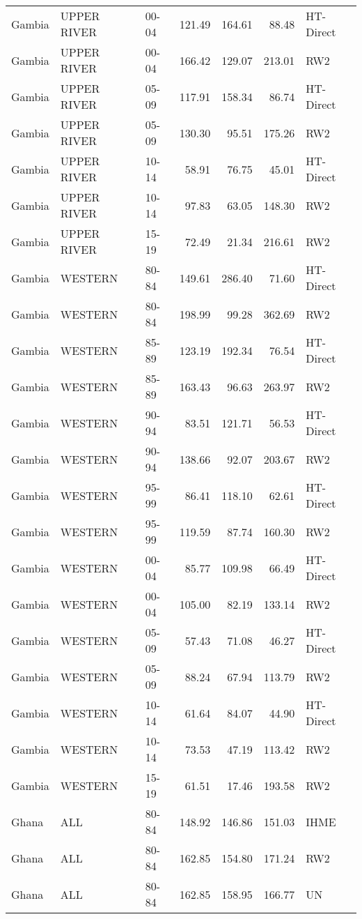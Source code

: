\begin{longtable}{lllrrrl}
  Gambia & UPPER RIVER & 00-04 & 121.49 & 164.61 & 88.48 & HT-Direct \\ 
  Gambia & UPPER RIVER & 00-04 & 166.42 & 129.07 & 213.01 & RW2 \\ 
  Gambia & UPPER RIVER & 05-09 & 117.91 & 158.34 & 86.74 & HT-Direct \\ 
  Gambia & UPPER RIVER & 05-09 & 130.30 & 95.51 & 175.26 & RW2 \\ 
  Gambia & UPPER RIVER & 10-14 & 58.91 & 76.75 & 45.01 & HT-Direct \\ 
  Gambia & UPPER RIVER & 10-14 & 97.83 & 63.05 & 148.30 & RW2 \\ 
  Gambia & UPPER RIVER & 15-19 & 72.49 & 21.34 & 216.61 & RW2 \\ 
  Gambia & WESTERN & 80-84 & 149.61 & 286.40 & 71.60 & HT-Direct \\ 
  Gambia & WESTERN & 80-84 & 198.99 & 99.28 & 362.69 & RW2 \\ 
  Gambia & WESTERN & 85-89 & 123.19 & 192.34 & 76.54 & HT-Direct \\ 
  Gambia & WESTERN & 85-89 & 163.43 & 96.63 & 263.97 & RW2 \\ 
  Gambia & WESTERN & 90-94 & 83.51 & 121.71 & 56.53 & HT-Direct \\ 
  Gambia & WESTERN & 90-94 & 138.66 & 92.07 & 203.67 & RW2 \\ 
  Gambia & WESTERN & 95-99 & 86.41 & 118.10 & 62.61 & HT-Direct \\ 
  Gambia & WESTERN & 95-99 & 119.59 & 87.74 & 160.30 & RW2 \\ 
  Gambia & WESTERN & 00-04 & 85.77 & 109.98 & 66.49 & HT-Direct \\ 
  Gambia & WESTERN & 00-04 & 105.00 & 82.19 & 133.14 & RW2 \\ 
  Gambia & WESTERN & 05-09 & 57.43 & 71.08 & 46.27 & HT-Direct \\ 
  Gambia & WESTERN & 05-09 & 88.24 & 67.94 & 113.79 & RW2 \\ 
  Gambia & WESTERN & 10-14 & 61.64 & 84.07 & 44.90 & HT-Direct \\ 
  Gambia & WESTERN & 10-14 & 73.53 & 47.19 & 113.42 & RW2 \\ 
  Gambia & WESTERN & 15-19 & 61.51 & 17.46 & 193.58 & RW2 \\ 
  Ghana & ALL & 80-84 & 148.92 & 146.86 & 151.03 & IHME \\ 
  Ghana & ALL & 80-84 & 162.85 & 154.80 & 171.24 & RW2 \\ 
  Ghana & ALL & 80-84 & 162.85 & 158.95 & 166.77 & UN \\ 

\end{longtable}
